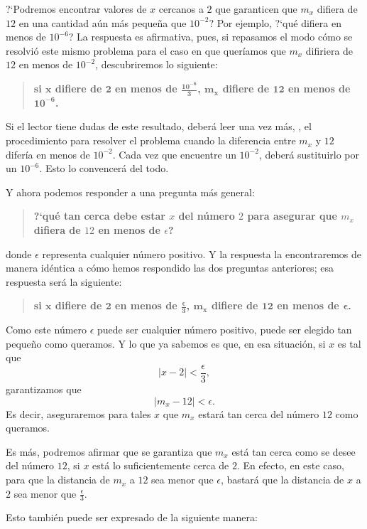 ?`Podremos encontrar valores de $x$ cercanos a $2$ que garanticen que $m_x$ difiera de $12$ en una
cantidad aún más pequeña que $10^{-2}$? Por ejemplo, ?`qué difiera en menos de $10^{-6}$? La
respuesta es afirmativa, pues, si repasamos el modo cómo se resolvió este mismo problema para el
caso en que queríamos que $m_x$ difiriera de $12$ en menos de $10^{-2}$, descubriremos lo
siguiente:
\begin{quote}
{\bfseries si $\bm{x}$ difiere de $\bm{2}$ en menos de $\bm{\displaystyle{\frac{10^{-6}}{3}}}$,
$\bm{m_x}$ difiere de $\bm{12}$ en menos de $\bm{10^{-6}}$.}
\end{quote}

Si el lector tiene dudas de este resultado, deberá leer una vez más,
, el procedimiento para resolver el problema cuando la
diferencia entre $m_x$ y $12$ difería en menos de $10^{-2}$. Cada vez que encuentre un $10^{-2}$,
deberá sustituirlo por un $10^{-6}$. Esto lo convencerá del todo.

Y ahora podemos responder a una pregunta más general:
\begin{quote}
{\bfseries ?`qué tan cerca debe estar $x$ del número $2$ para asegurar que $m_x$ difiera de $12$ en
menos de $\epsilon$?}
\end{quote}
donde $\epsilon$ representa cualquier número positivo. Y la respuesta la encontraremos de manera
idéntica a cómo hemos respondido las dos preguntas anteriores; esa respuesta será la siguiente:
\begin{quote}
{\bfseries si $\bm{x}$ difiere de $\bm{2}$ en menos de $\bm{\displaystyle{\frac{\epsilon}{3}}}$,
$\bm{m_x}$ difiere de $\bm{12}$ en menos de $\bm{\epsilon}$.}
\end{quote}

Como este número $\epsilon$ puede ser cualquier número positivo, puede ser elegido tan pequeño como
queramos. Y lo que ya sabemos es que, en esa situación, si $x$ es tal que
\[
|x - 2| < \frac{\epsilon}{3},
\]
garantizamos que
\[
|m_x - 12| < \epsilon.
\]
Es decir, aseguraremos para tales $x$ que $m_x$ estará tan cerca del número $12$ como queramos.

Es más, podremos afirmar que se garantiza que $m_x$ está tan cerca como se desee del número $12$,
si $x$ está lo suficientemente cerca de $2$. En efecto, en este caso, para que la distancia de
$m_x$ a $12$ sea menor que $\epsilon$, bastará que la distancia de $x$ a $2$ sea menor que
$\frac{\epsilon}{3}$.

Esto también puede ser expresado de la siguiente manera:

